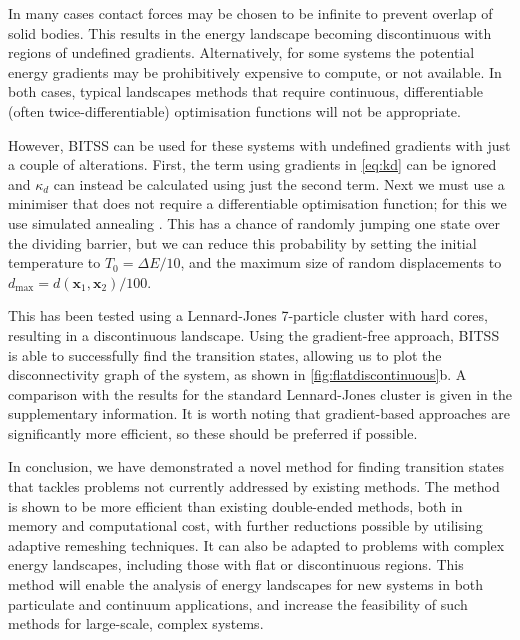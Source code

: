 \documentclass[aps,prl,twocolumn,groupedaddress]{revtex4}
\begin{document}
\topic In many cases contact forces may be chosen to be infinite to prevent overlap of solid bodies.
This results in the energy landscape becoming discontinuous with regions of undefined gradients.
Alternatively, for some systems the potential energy gradients may be prohibitively expensive to compute, or not available.
In both cases, typical landscapes methods that require continuous, differentiable (often twice-differentiable) optimisation functions will not be appropriate.

\topic However, BITSS can be used for these systems with undefined gradients with just a couple of alterations.
First, the term using gradients in \cref{eq:kd} can be ignored and $\kappa_d$ can instead be calculated using just the second term.
Next we must use a minimiser that does not require a differentiable optimisation function; for this we use simulated annealing \cite{Kirkpatrick1983}.
This has a chance of randomly jumping one state over the dividing barrier, but we can reduce this probability by setting the initial temperature to $T_0 = \Delta E / 10$, and the maximum size of random displacements to $d_\text{max} = d(\bm{x}_1, \bm{x}_2) / 100$.

\topic This has been tested using a Lennard-Jones 7-particle cluster with hard cores, resulting in a discontinuous landscape.
Using the gradient-free approach, BITSS is able to successfully find the transition states, allowing us to plot the disconnectivity graph of the system, as shown in \cref{fig:flatdiscontinuous}b.
A comparison with the results for the standard Lennard-Jones cluster is given in the supplementary information.
It is worth noting that gradient-based approaches are significantly more efficient, so these should be preferred if possible.


\topic In conclusion, we have demonstrated a novel method for finding transition states that tackles problems not currently addressed by existing methods.
The method is shown to be more efficient than existing double-ended methods, both in memory and computational cost, with further reductions possible by utilising adaptive remeshing techniques.
It can also be adapted to problems with complex energy landscapes, including those with flat or discontinuous regions.
This method will enable the analysis of energy landscapes for new systems in both particulate and continuum applications, and increase the feasibility of such methods for large-scale, complex systems.


% 

\end{document}
